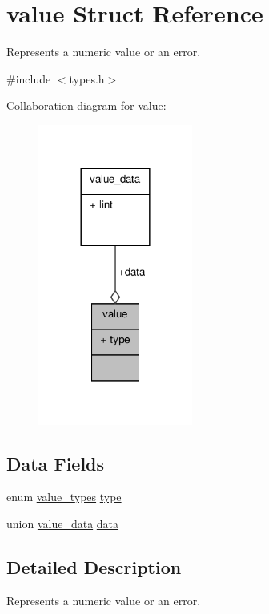 \hypertarget{structvalue}{\section{value Struct Reference}
\label{structvalue}
}


Represents a numeric value or an error.  




{\ttfamily \#include $<$types.\+h$>$}



Collaboration diagram for value\+:\nopagebreak
\begin{figure}[H]
\begin{center}
\leavevmode
\includegraphics[width=144pt]{structvalue__coll__graph}
\end{center}
\end{figure}
\subsection*{Data Fields}
\begin{DoxyCompactItemize}
\item 
enum \hyperlink{types_8h_a2763ddd86ab6e5f5f4c34c0561d4cd39}{value\+\_\+types} \hyperlink{structvalue_a51293d8a9946f28f389010bf83820015}{type}
\item 
union \hyperlink{unionvalue__data}{value\+\_\+data} \hyperlink{structvalue_a7a505de18bdf859cc9246069c70c18b5}{data}
\end{DoxyCompactItemize}


\subsection{Detailed Description}
Represents a numeric value or an error. 


